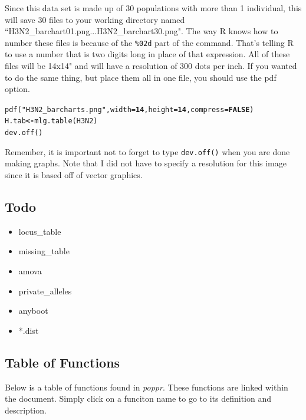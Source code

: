 \documentclass[letterpaper]{article}\usepackage[]{graphicx}\usepackage[]{color}
\makeatletter
\newcommand{\hlnum}[1]{\textcolor[rgb]{0.502,0,0.502}{\textbf{#1}}}%
\newcommand{\hlstr}[1]{\textcolor[rgb]{0.651,0.522,0}{#1}}%
\newcommand{\hlstd}[1]{\textcolor[rgb]{0,0,0}{#1}}%
\newcommand{\hlkwb}[1]{\textcolor[rgb]{0.502,0.502,0.753}{\textbf{#1}}}%
\newcommand{\hlkwc}[1]{\textcolor[rgb]{0,0.502,0.753}{#1}}%
\newcommand{\hlkwd}[1]{\textcolor[rgb]{0,0.267,0.4}{#1}}%
\newenvironment{kframe}{%
 \def\at@end@of@kframe{}%
 \ifinner\ifhmode%
  \def\at@end@of@kframe{\end{minipage}}%
  \begin{minipage}{\columnwidth}%
 \fi\fi%
 \def\FrameCommand##1{\hskip\@totalleftmargin \hskip-\fboxsep
 \colorbox{shadecolor}{##1}\hskip-\fboxsep
     \hskip-\linewidth \hskip-\@totalleftmargin \hskip\columnwidth}%
 \MakeFramed {\advance\hsize-\width
   \@totalleftmargin\z@ \linewidth\hsize
   \@setminipage}}%
 {\par\unskip\endMakeFramed%
 \at@end@of@kframe}
\newenvironment{knitrout}{}{} %
\newcommand{\tab}{\hspace*{1em}}
\makeatother
\begin{document}
Since this data set is made up of 30 populations with more than 1 individual, this will save 30 files to your working directory named ``H3N2\_barchart01.png...H3N2\_barchart30.png". The way R knows how to number these files is because of the \texttt{\%02d} part of the command. That's telling R to use a number that is two digits long in place of that expression. All of these files will be 14x14" and will have a resolution of 300 dots per inch. If you wanted to do the same thing, but place them all in one file, you should use the pdf option.

\begin{knitrout}\footnotesize
{}\color{fgcolor}\begin{kframe}
\begin{alltt}
\hlkwd{pdf}\hlstd{(}\hlstr{"H3N2_barcharts.png"}\hlstd{,} \hlkwc{width} \hlstd{=} \hlnum{14}\hlstd{,} \hlkwc{height} \hlstd{=} \hlnum{14}\hlstd{,} \hlkwc{compress} \hlstd{=} \hlnum{FALSE}\hlstd{)}
\hlstd{H.tab} \hlkwb{<-} \hlkwd{mlg.table}\hlstd{(H3N2)}
\hlkwd{dev.off}\hlstd{()}
\end{alltt}
\end{kframe}
\end{knitrout}


Remember, it is important not to forget to type \texttt{dev.off()} when you are done making graphs. Note that I did not have to specify a resolution for this image since it is based off of vector graphics.

\subsection{Todo}

\begin{itemize}
  \item locus\_table
  \item missing\_table
  \item amova
  \item private\_alleles
  \item anyboot
  \item *.dist
\end{itemize}

\subsection{Table of Functions}\label{appendix:funk}

\tab\tab Below is a table of functions found in \textit{poppr}. These functions are
linked within the document. Simply click on a funciton name to go to its definition 
and description. 
\end{document}

